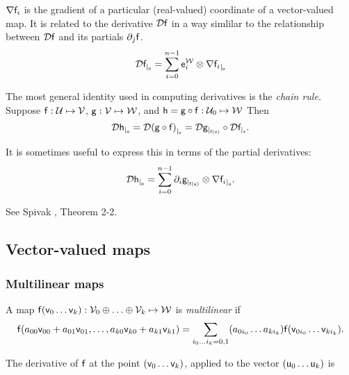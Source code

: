 ${\mathbf \nabla}{\mathsf{f}_i}$ is the gradient of a particular (real-valued) coordinate
of a vector-valued map. It is related to the derivative ${\mathcal{D}{\mathsf{f}}}$
in a way simlilar to the relationship between ${\mathcal{D}{\mathsf{f}}}$ and its partials ${\partial}_{j}{\mathsf{f}}$.
\begin{equation}
{\mathcal{D}{\mathsf{f}}_{\mid_{\mathsf{u}}}} = \sum_{i=0}^{n-1}  \mathsf{e}_i^{\mathcal{W}} \otimes {\mathbf \nabla}{\mathsf{f}_i}_{\mid_{\mathsf{u}}}
\end{equation}

The most general identity used in computing derivatives is the {\it chain rule.}
Suppose
$\mathsf{f}:\mathcal{U} \mapsto \mathcal{V}$,
$\mathsf{g}:\mathcal{V} \mapsto \mathcal{W}$,
and
$\mathsf{h} = \mathsf{g} \circ \mathsf{f} : \mathcal{U}_0 \mapsto \mathcal{W}$
Then
\begin{equation}
\label{eq:chain_rule}
{\mathcal{D}{\mathsf{h}}_{\mid_{\mathsf{u}}}}
=  {\mathcal{D}{(\mathsf{g} \circ \mathsf{f})}_{\mid_{\mathsf{v}}}}
=  {\mathcal{D}{\mathsf{g}}_{\mid_{\mathsf{f}(\mathsf{v})}}}  \circ  {\mathcal{D}{\mathsf{f}}_{\mid_{\mathsf{v}}}}.
\end{equation}

It is sometimes useful to express this in terms of the partial derivatives:
\begin{equation}
\label{eq:chain_rule_partials}
{\mathcal{D}{\mathsf{h}}_{\mid_{\mathsf{u}}}} =  \sum_{i=0}^{n-1} {\partial}_{i}{\mathsf{g}}_{\mid_{\mathsf{f}(\mathsf{u})}} \otimes  {\mathbf \nabla}{\mathsf{f}_i}_{\mid_{\mathsf{u}}}.
\end{equation}

See Spivak \cite{spivak-1965}, Theorem 2-2.



\subsection{Vector-valued maps}


\subsubsection{Multilinear maps}
\label{sec:Multilinear-maps}

A map $\mathsf{f}(\mathsf{v}_0 \ldots \mathsf{v}_k):\mathcal{V}_0 \oplus \ldots \oplus \mathcal{V}_k \mapsto \mathcal{W}$
is {\it multilinear} if
\begin{equation}
\mathsf{f}(a_{00} \mathsf{v}_{00} + a_{01} \mathsf{v}_{01}, \ldots, a_{k0} \mathsf{v}_{k0} + a_{k1} \mathsf{v}_{k1})
 =  \sum_{i_0 \ldots i_k = 0,1} (a_{0i_0} \ldots a_{ki_k}) \mathsf{f}(\mathsf{v}_{0i_0} \ldots \mathsf{v}_{ki_k}).
\end{equation}

The derivative of $\mathsf{f}$
at the point $(\mathsf{v}_0 \ldots \mathsf{v}_k)$, applied to the vector $(\mathsf{u}_0 \ldots \mathsf{u}_k)$ is

